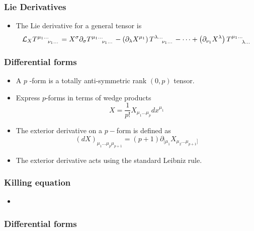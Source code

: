 \subsubsection*{Lie Derivatives}
\begin{itemize}
	\item The Lie derivative for a general tensor is 
		\[
		 \mathcal{L}_X T \indices{^{ \mu_1 \dots } _{ \nu_1 \dots } }  = 
		 X ^ \sigma \partial  _ \sigma T \indices{ ^{ \mu_1 \dots }_{ \nu_1 \dots } }
		  - \left( \partial  _ \lambda X ^{ \mu_1 }  \right)   T \indices{ ^{ \lambda \dots }
		  _{ \nu_1 \dots } }  - \dots  + \left( \partial  _{ \nu_1 } X ^{ \lambda }  \right) 
		  T \indices{ ^{ \mu_1 \dots } _{ \lambda \dots } }  
		\] 
\end{itemize}

\subsubsection*{Differential forms}
\begin{itemize}
	\item  A $ p $ -form is a totally anti-symmetric rank $ \left( 0 , p  \right)  $ 
		tensor. 
	\item Express $p$-forms in terms of wedge products 
		\[
		 X  = \frac{1}{p ! } X _{ \mu_1 \dots \mu_p } 
		 dx^{ \mu_1 }
		\] 
	\item The exterior derivative on a $ p-$form is defined as 
		\[
			\left( d X  \right)_{ 
			\mu_1 \dots \mu_{ p } \mu _{ p + 1 } }  = 
			\left( p + 1  \right)  \partial _{ [ \mu_1 } X_{ 
			\mu_2 \dots \mu_{ p + 1 }  ] }
		\] 
	\item The exterior derivative acts using the standard Leibniz rule.  
\end{itemize}

\subsubsection*{Killing equation}
\begin{itemize}
	\item  
\end{itemize}

\subsubsection*{Differential forms}

